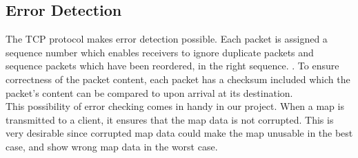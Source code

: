 \subsection{Error Detection}
The TCP protocol makes error detection possible. Each packet is assigned a sequence number which enables receivers to ignore duplicate packets and sequence packets which have been reordered, in the right sequence. . To ensure correctness of the packet content, each packet has a checksum included which the packet's content can be compared to upon arrival at its destination.\\

This possibility of error checking comes in handy in our project. When a map is transmitted to a client, it ensures that the map data is not corrupted. This is very desirable since corrupted map data could make the map unusable in the best case, and show wrong map data in the worst case.